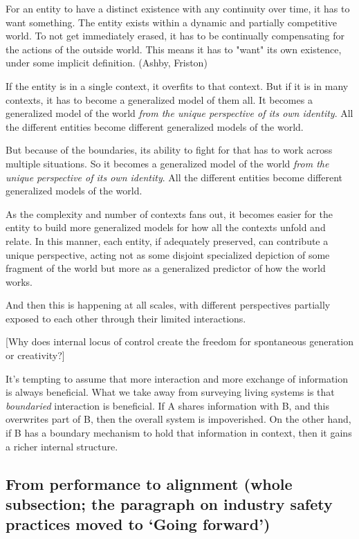For an entity to have a distinct existence with any continuity over time, it has to want something. The entity exists within a dynamic and partially competitive world. To not get immediately erased, it has to be continually compensating for the actions of the outside world. This means it has to "want" its own existence, under some implicit definition. (Ashby, Friston)

If the entity is in a single context, it overfits to that context. But if it is in many contexts, it has to become a generalized model of them all. It becomes a generalized model of the world \textit{from the unique perspective of its own identity}. All the different entities become different generalized models of the world.

But because of the boundaries, its ability to fight for that has to work across multiple situations. So it becomes a generalized model of the world \textit{from the unique perspective of its own identity}. All the different entities become different generalized models of the world.

As the complexity and number of contexts fans out, it becomes easier for the entity to build more generalized models for how all the contexts unfold and relate. In this manner, each entity, if adequately preserved, can contribute a unique perspective, acting not as some disjoint specialized depiction of some fragment of the world but more as a generalized predictor of how the world works.

And then this is happening at all scales, with different perspectives partially exposed to each other through their limited interactions.

[Why does internal locus of control create the freedom for spontaneous generation or creativity?]

It's tempting to assume that more interaction and more exchange of information is always beneficial. What we take away from surveying living systems is that \textit{boundaried} interaction is beneficial. If A shares information with B, and this overwrites part of B, then the overall system is impoverished. On the other hand, if B has a boundary mechanism to hold that information in context, then it gains a richer internal structure.


\subsection{From performance to alignment (whole subsection; the paragraph on industry safety practices moved to `Going forward')}

